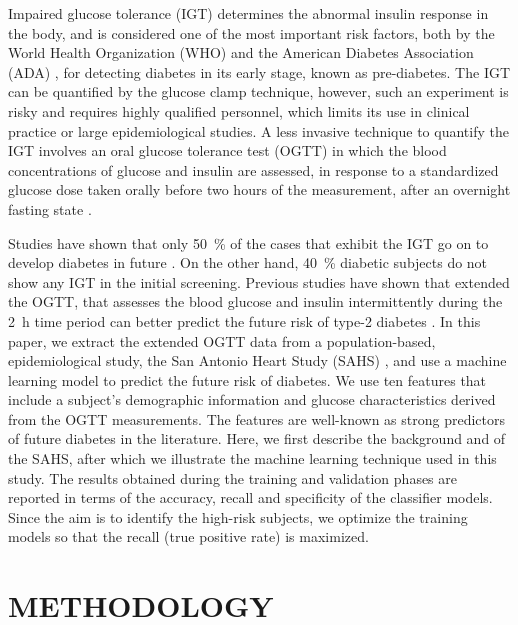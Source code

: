 \documentclass[a4paper,twoside]{article}
\begin{document}
Impaired glucose tolerance (IGT) determines the abnormal insulin response in the body, and is considered one of the most important risk factors, both by the World Health Organization (WHO) \cite{organization_definition_2006} and the American Diabetes Association (ADA) \cite{american_diabetes_association_diagnosis_2005}, for detecting diabetes in its early stage, known as pre-diabetes. The IGT can be quantified by the glucose clamp technique, however, such an experiment is risky and requires highly qualified personnel, which limits its use in clinical practice or large epidemiological studies. A less invasive technique to quantify the IGT involves an oral glucose tolerance test (OGTT) in which the blood concentrations of glucose and insulin are assessed, in response to a standardized glucose dose taken orally before two hours of the measurement, after an overnight fasting state \cite{tschritter_assessing_2003}. 

Studies have shown that only \SI{50}{\percent} of the cases that exhibit the IGT go on to develop diabetes in future \cite{shaw_impaired_1999,writing_committee_impaired_2002}. On the other hand, \SI{40}{\percent} diabetic subjects do not show any IGT in the initial screening. Previous studies have shown that extended the OGTT, that assesses the blood glucose and insulin intermittently during the \SI{2}{\hour} time period can better predict the future risk of type-2 diabetes \cite{abdul-ghani_what_2007}. In this paper, we extract the extended OGTT data from a population-based, epidemiological study, the San Antonio Heart Study (SAHS) \cite{burke_rapid_1999,lorenzo_trend_2006}, and use a machine learning model to predict the future risk of diabetes. We use ten features that include a subject's demographic information and glucose characteristics derived from the OGTT measurements. The features are well-known as strong predictors of future diabetes in the literature. Here, we first describe the background and of the SAHS, after which we illustrate the machine learning technique used in this study. The results obtained during the training and validation phases are reported in terms of the accuracy, recall and specificity of the classifier models. Since the aim is to identify the high-risk subjects, we optimize the training models so that the recall (true positive rate) is maximized.
\section{\uppercase{Methodology}}
% 
\end{document}
